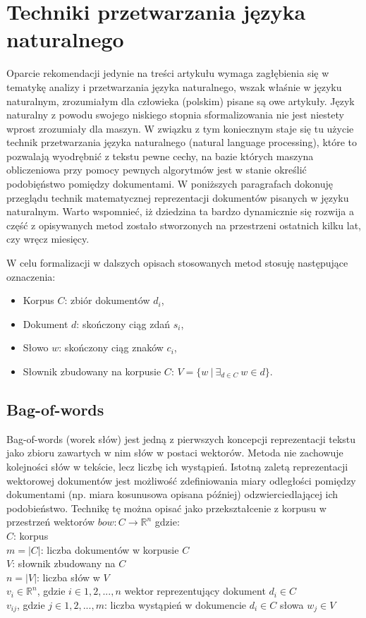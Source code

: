 \documentclass[pl]{minipw} %
\begin{document}
\section{Techniki przetwarzania języka naturalnego}
Oparcie rekomendacji jedynie na treści artykułu wymaga zagłębienia się w tematykę analizy i przetwarzania języka naturalnego, wszak właśnie w języku naturalnym, zrozumiałym dla człowieka (polskim) pisane są owe artykuły. Język naturalny z powodu swojego niskiego stopnia sformalizowania nie jest niestety wprost zrozumiały dla maszyn. W związku z tym koniecznym staje się tu użycie technik przetwarzania języka naturalnego (natural language processing), które to pozwalają wyodrębnić z tekstu pewne cechy, na bazie których maszyna obliczeniowa przy pomocy pewnych algorytmów jest w stanie określić podobięństwo pomiędzy dokumentami. W poniższych paragrafach dokonuję przeglądu technik matematycznej reprezentacji dokumentów pisanych w języku naturalnym. Warto wspomnieć, iż dziedzina ta bardzo dynamicznie się rozwija a część z opisywanych metod zostało stworzonych na przestrzeni ostatnich kilku lat, czy wręcz miesięcy.

W celu formalizacji w dalszych opisach stosowanych metod stosuję następujące oznaczenia:
\begin{itemize}
	\item Korpus $C$: zbiór dokumentów $d_i$,
	\item Dokument $d$: skończony ciąg zdań $s_i$,
	\item Słowo $w$: skończony ciąg znaków $c_i$,
	\item Słownik zbudowany na korpusie $C$: $V = \{w\ |\ \exists_{d \in C}\ w \in d\}$.
\end{itemize}

\subsection{Bag-of-words}
Bag-of-words (worek słów)\cite{bow} jest jedną z pierwszych koncepcji reprezentacji tekstu jako zbioru zawartych w nim słów w postaci wektorów. Metoda nie zachowuje kolejności słów w tekście, lecz liczbę ich wystąpień. Istotną zaletą reprezentacji wektorowej dokumentów jest możliwość zdefiniowania miary odległości pomiędzy dokumentami (np. miara kosunusowa opisana później) odzwierciedlającej ich podobieństwo. Technikę tę można opisać jako przekształcenie z korpusu w przestrzeń wektorów $ bow: C \to \mathbb{R}^n $ gdzie:\\
$C$: korpus\\
$m = |C|$: liczba dokumentów w korpusie $C$\\
$V$: słownik zbudowany na $C$\\
$n = |V|$: liczba słów w $V$\\
$v_i \in \mathbb{R}^n$, gdzie $i \in 1, 2, ..., n$ wektor reprezentujący dokument $d_i \in C$\\
$v_{ij}$, gdzie $j \in 1, 2, ..., m$: liczba wystąpień w dokumencie  $d_i \in C$ słowa $w_j \in V$\\
\end{document}
